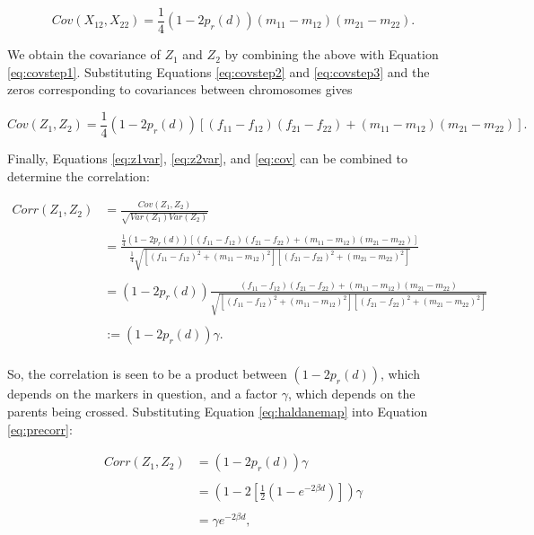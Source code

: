 \documentclass{article}
\begin{document}
\begin{equation} \label{eq:covstep3}
  Cov(X_{12}, X_{22}) = \frac{1}{4} \left ( 1 - 2 p_r(d) \right ) (m_{11} - m_{12})(m_{21} - m_{22}).
\end{equation}

\noindent We obtain the covariance of $Z_1$ and $Z_2$ by combining the above with Equation \ref{eq:covstep1}. Substituting Equations \ref{eq:covstep2} and \ref{eq:covstep3} and the zeros corresponding to covariances between chromosomes gives

\begin{equation} \label{eq:cov}
  Cov(Z_1, Z_2) = \frac{1}{4} (1 - 2 p_r(d)) \left [ (f_{11} - f_{12})(f_{21} - f_{22}) + (m_{11} - m_{12})(m_{21} - m_{22}) \right ].
\end{equation}

\noindent Finally, Equations \ref{eq:z1var}, \ref{eq:z2var}, and \ref{eq:cov} can be combined to determine the correlation:

\begin{equation} \label{eq:precorr}
  \begin{split}
    Corr(Z_1, Z_2) & = \frac{Cov(Z_1, Z_2)}{\sqrt{Var(Z_1) Var(Z_2)}}\\
    & \\
    & = \frac{ \frac{1}{4} (1 - 2 p_r(d)) \left [ (f_{11} - f_{12})(f_{21} - f_{22}) + (m_{11} - m_{12})(m_{21} - m_{22}) \right ] }{ \frac{1}{4} \sqrt{ \left [ (f_{11} - f_{12})^2 + (m_{11} - m_{12})^2 \right ] \left [ (f_{21} - f_{22})^2 + (m_{21} - m_{22})^2 \right ] }} \\
    & \\
    & = (1 - 2 p_r(d)) \frac{ (f_{11} - f_{12})(f_{21} - f_{22}) + (m_{11} - m_{12})(m_{21} - m_{22}) }{ \sqrt{ \left [ (f_{11} - f_{12})^2 + (m_{11} - m_{12})^2 \right ] \left [ (f_{21} - f_{22})^2 + (m_{21} - m_{22})^2 \right ] }} \\
    & \\
    & := (1 - 2 p_r(d)) \gamma .\\
  \end{split}
\end{equation}

\noindent So, the correlation is seen to be a product between $(1-2 p_r(d))$, which depends on the markers in question, and a factor $\gamma$, which depends on the parents being crossed. Substituting Equation \ref{eq:haldanemap} into Equation \ref{eq:precorr}:

\begin{equation} \label{eq:corrdist}
  \begin{split}
    Corr(Z_1, Z_2) & = (1 - 2 p_r(d)) \gamma \\
    & \\
    & = \left ( 1 - 2 \left [ \frac{1}{2} \left ( 1 - e^{-2 \beta d} \right ) \right ] \right ) \gamma \\
    & \\
    & = \gamma e^{-2 \beta d}, \\
  \end{split}
\end{equation}
\end{document}
